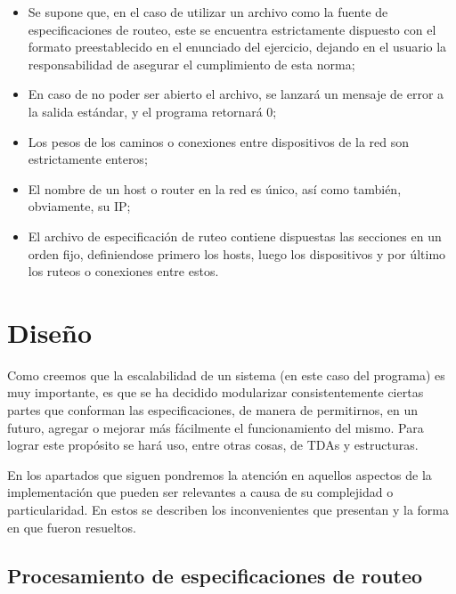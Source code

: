 \documentclass{article}
\begin{document}
\begin{itemize}
	\itemsep=3pt \topsep=0pt \partopsep=0pt \parskip=0pt \parsep=0pt

	\item Se supone que, en el caso de utilizar un archivo como la fuente de especificaciones de routeo, este se encuentra estrictamente dispuesto con el formato preestablecido en el enunciado del ejercicio, dejando en el usuario la responsabilidad de asegurar el cumplimiento de esta norma;

	\item En caso de no poder ser abierto el archivo, se lanzará un mensaje de error a la salida estándar, y el programa retornará 0;

	\item Los pesos de los caminos o conexiones entre dispositivos de la red son estrictamente enteros;

	\item El nombre de un host o router en la red es único, así como también, obviamente, su IP;

	\item El archivo de especificación de ruteo contiene dispuestas las secciones en un orden fijo, definiendose primero los hosts, luego los dispositivos y por último los ruteos o conexiones entre estos.

\end{itemize}
\smallskip




\section{Diseño}

	Como creemos que la escalabilidad de un sistema (en este caso del programa) es muy importante, es que se ha decidido modularizar consistentemente ciertas partes que conforman las especificaciones, de manera de permitirnos, en un futuro, agregar o mejorar más fácilmente el funcionamiento del mismo. Para lograr este propósito se hará uso, entre otras cosas, de TDAs y estructuras.
	\par
	En los apartados que siguen pondremos la atención en aquellos aspectos de la implementación que pueden ser relevantes a causa de su complejidad o particularidad. En estos se describen los inconvenientes que presentan y la forma en que fueron resueltos.
\bigskip



\subsection{Procesamiento de especificaciones de routeo}
\end{document}
